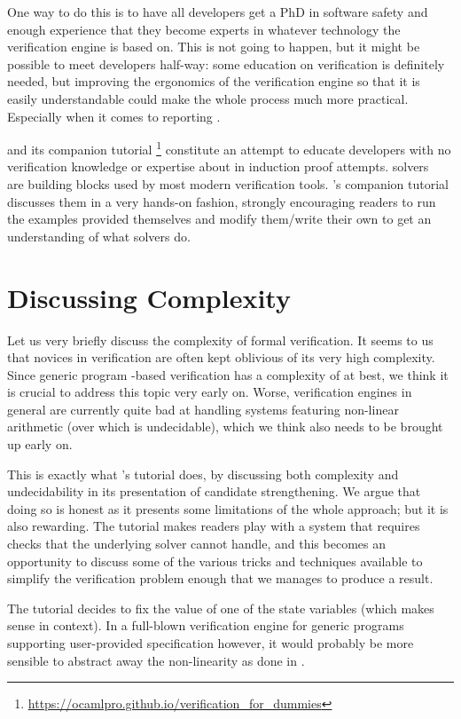 \smallskip{}

One way to do this is to have all developers get a PhD in software safety and enough experience
that they become experts in whatever technology the verification engine is based on. This is not
going to happen, but it might be possible to meet developers half-way: some education on
verification is definitely needed, but improving the ergonomics of the verification engine so that
it is easily understandable could make the whole process much more practical. Especially when it
comes to reporting .

\smallskip{}

\Mkn{} and its companion tutorial %
\footnote{%
    \url{https://ocamlpro.github.io/verification_for_dummies}%
}
%
constitute an attempt to educate developers with no verification knowledge or expertise about
 in  induction proof attempts. \smt{}
solvers~\cite{smt} are building blocks used by most modern verification tools. \Mkn{}'s companion
tutorial discusses them in a very hands-on fashion, strongly encouraging readers to run the
examples provided themselves and modify them/write their own to get an understanding of what \smt{}
solvers do.






\section{Discussing Complexity}
\label{sec:complexity}

Let us very briefly discuss the complexity of formal verification. It seems to us that novices in
verification are often kept oblivious of its very high complexity. Since generic program
\smt{}-based verification has a complexity of  at best, we think it is crucial to
address this topic very early on. Worse, verification engines in general are currently quite bad at
handling systems featuring non-linear arithmetic (over which \smt{} is undecidable), which we think
also needs to be brought up early on.

This is exactly what \mkn{}'s tutorial does, by discussing both complexity and undecidability in
its presentation of candidate strengthening. We argue that doing so is honest as it presents some
limitations of the whole approach; but it is also rewarding. The tutorial makes readers play with a
system that requires \smt{} checks that the underlying \smt{} solver cannot handle, and this
becomes an opportunity to discuss some of the various tricks and techniques available to simplify
the verification problem enough that we \mkn{} manages to produce a result.

The tutorial decides to fix the value of one of the state variables (which makes sense in context).
In a full-blown verification engine for generic programs supporting user-provided specification
however, it would probably be more sensible to abstract away the non-linearity as done in
\cite{cocospec}.
